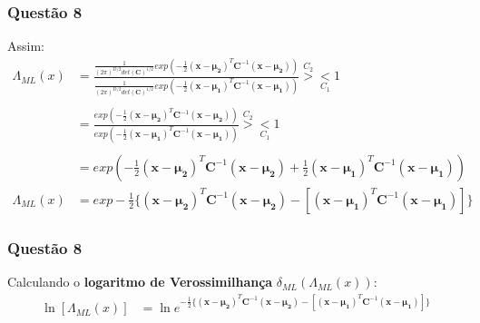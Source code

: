 \documentclass{beamer}\usepackage[]{graphicx}\usepackage[]{color}
\begin{document}
		\begin{frame}
			\frametitle{Questão 8}
			Assim:
			\begin{align*}
				\Lambda_{ML}(x) &= \frac{\frac{1}{(2\pi)^{D/2}det(\boldsymbol{C})^{1/2}}exp(-\frac{1}{2}(\boldsymbol{x} - \boldsymbol{\mu_{2}})^{T}\boldsymbol{C}^{-1}(\boldsymbol{x} - \boldsymbol{\mu_{2}}))}{\frac{1}{(2\pi)^{D/2}det(\boldsymbol{C})^{1/2}}exp(-\frac{1}{2}(\boldsymbol{x} - \boldsymbol{\mu_{1}})^{T}\boldsymbol{C}^{-1}(\boldsymbol{x} - \boldsymbol{\mu_{1}}))}\overset{C_{2}}{>} \underset{C_{1}}{<} 1\\
				\\
				&= \frac{exp(-\frac{1}{2}(\boldsymbol{x} - \boldsymbol{\mu_{2}})^{T}\boldsymbol{C}^{-1}(\boldsymbol{x} - \boldsymbol{\mu_{2}}))}{exp(-\frac{1}{2}(\boldsymbol{x} - \boldsymbol{\mu_{1}})^{T}\boldsymbol{C}^{-1}(\boldsymbol{x} - \boldsymbol{\mu_{1}}))}\overset{C_{2}}{>} \underset{C_{1}}{<} 1\\
				\\
				&=exp(-\frac{1}{2}(\boldsymbol{x} - \boldsymbol{\mu_{2}})^{T}\boldsymbol{C}^{-1}(\boldsymbol{x} - \boldsymbol{\mu_{2}}) + \frac{1}{2}(\boldsymbol{x} - \boldsymbol{\mu_{1}})^{T}\boldsymbol{C}^{-1}(\boldsymbol{x} - \boldsymbol{\mu_{1}}))\\
				\Lambda_{ML}(x) &= exp-\frac{1}{2}\{(\boldsymbol{x} - \boldsymbol{\mu_{2}})^{T}\boldsymbol{C}^{-1}(\boldsymbol{x} - \boldsymbol{\mu_{2}}) - [(\boldsymbol{x} - \boldsymbol{\mu_{1}})^{T}\boldsymbol{C}^{-1}(\boldsymbol{x} - \boldsymbol{\mu_{1}})]\}
			\end{align*}
		\end{frame}
		
		\begin{frame}
			\frametitle{Questão 8}
			Calculando o \textbf{logaritmo de Verossimilhança} $\delta_{ML}(\Lambda_{ML}(x))$:
			\begin{align*}
				\ln[\Lambda_{ML}(x)] &= \ln{e^{-\frac{1}{2}\{(\boldsymbol{x} - \boldsymbol{\mu_{2}})^{T}\boldsymbol{C}^{-1}(\boldsymbol{x} - \boldsymbol{\mu_{2}}) - [(\boldsymbol{x} - \boldsymbol{\mu_{1}})^{T}\boldsymbol{C}^{-1}(\boldsymbol{x} - \boldsymbol{\mu_{1}})]\}}} 
			\end{align*}
		\end{frame}
\end{document}

